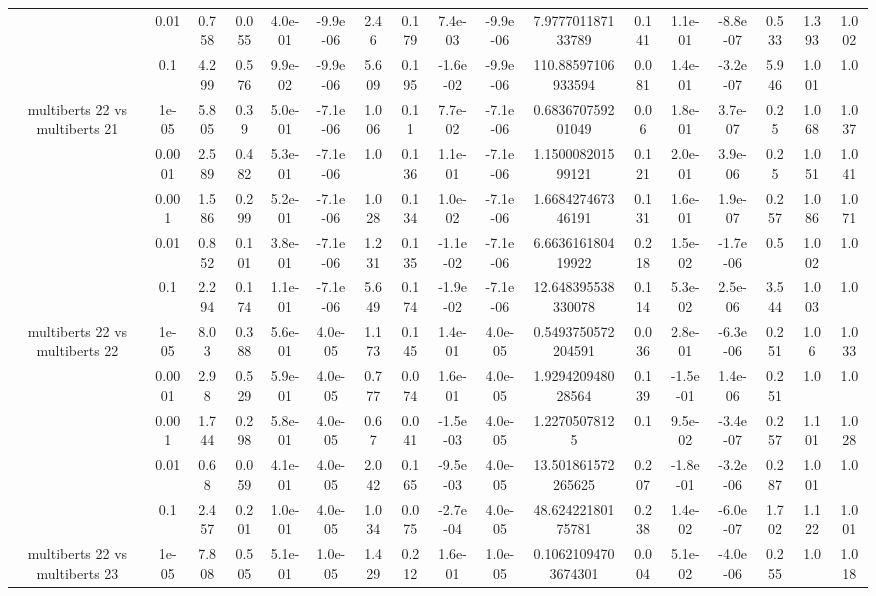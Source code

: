 \begin{tabular}{|c|c|c|c|c|c|c|c|c|c|c|c|c|c|c|c|c|}
 & 0.01 & 0.758 & 0.055 & 4.0e-01 & -9.9e-06 & 2.46 & 0.179 & 7.4e-03 & -9.9e-06 & 7.977701187133789 & 0.141 & 1.1e-01 & -8.8e-07 & 0.533 & 1.393 & 1.002 \\
 & 0.1 & 4.299 & 0.576 & 9.9e-02 & -9.9e-06 & 5.609 & 0.195 & -1.6e-02 & -9.9e-06 & 110.88597106933594 & 0.081 & 1.4e-01 & -3.2e-07 & 5.946 & 1.001 & 1.0 \\
\hline
\multirow{5}{*}{multiberts 22 vs multiberts 21} & 1e-05 & 5.805 & 0.39 & 5.0e-01 & -7.1e-06 & 1.006 & 0.11 & 7.7e-02 & -7.1e-06 & 0.683670759201049 & 0.06 & 1.8e-01 & 3.7e-07 & 0.25 & 1.068 & 1.037 \\
 & 0.0001 & 2.589 & 0.482 & 5.3e-01 & -7.1e-06 & 1.0 & 0.136 & 1.1e-01 & -7.1e-06 & 1.150008201599121 & 0.121 & 2.0e-01 & 3.9e-06 & 0.25 & 1.051 & 1.041 \\
 & 0.001 & 1.586 & 0.299 & 5.2e-01 & -7.1e-06 & 1.028 & 0.134 & 1.0e-02 & -7.1e-06 & 1.668427467346191 & 0.131 & 1.6e-01 & 1.9e-07 & 0.257 & 1.086 & 1.071 \\
 & 0.01 & 0.852 & 0.101 & 3.8e-01 & -7.1e-06 & 1.231 & 0.135 & -1.1e-02 & -7.1e-06 & 6.663616180419922 & 0.218 & 1.5e-02 & -1.7e-06 & 0.5 & 1.002 & 1.0 \\
 & 0.1 & 2.294 & 0.174 & 1.1e-01 & -7.1e-06 & 5.649 & 0.174 & -1.9e-02 & -7.1e-06 & 12.648395538330078 & 0.114 & 5.3e-02 & 2.5e-06 & 3.544 & 1.003 & 1.0 \\
\hline
\multirow{5}{*}{multiberts 22 vs multiberts 22} & 1e-05 & 8.03 & 0.388 & 5.6e-01 & 4.0e-05 & 1.173 & 0.145 & 1.4e-01 & 4.0e-05 & 0.5493750572204591 & 0.036 & 2.8e-01 & -6.3e-06 & 0.251 & 1.06 & 1.033 \\
 & 0.0001 & 2.98 & 0.529 & 5.9e-01 & 4.0e-05 & 0.777 & 0.074 & 1.6e-01 & 4.0e-05 & 1.929420948028564 & 0.139 & -1.5e-01 & 1.4e-06 & 0.251 & 1.0 & 1.0 \\
 & 0.001 & 1.744 & 0.298 & 5.8e-01 & 4.0e-05 & 0.67 & 0.041 & -1.5e-03 & 4.0e-05 & 1.22705078125 & 0.1 & 9.5e-02 & -3.4e-07 & 0.257 & 1.101 & 1.028 \\
 & 0.01 & 0.68 & 0.059 & 4.1e-01 & 4.0e-05 & 2.042 & 0.165 & -9.5e-03 & 4.0e-05 & 13.501861572265625 & 0.207 & -1.8e-01 & -3.2e-06 & 0.287 & 1.001 & 1.0 \\
 & 0.1 & 2.457 & 0.201 & 1.0e-01 & 4.0e-05 & 1.034 & 0.075 & -2.7e-04 & 4.0e-05 & 48.62422180175781 & 0.238 & 1.4e-02 & -6.0e-07 & 1.702 & 1.122 & 1.001 \\
\hline
\multirow{5}{*}{multiberts 22 vs multiberts 23} & 1e-05 & 7.808 & 0.505 & 5.1e-01 & 1.0e-05 & 1.429 & 0.212 & 1.6e-01 & 1.0e-05 & 0.10621094703674301 & 0.004 & 5.1e-02 & -4.0e-06 & 0.255 & 1.0 & 1.018 \\

\end{tabular}
